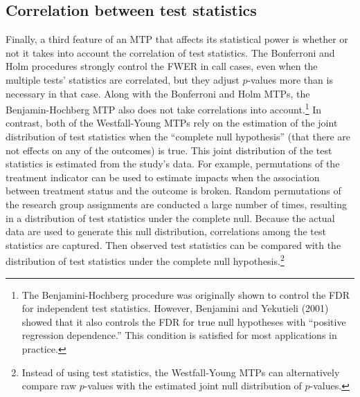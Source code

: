 \documentclass[
]{article}
\begin{document}
\subsection{Correlation between test statistics}
\label{sec:corr}

Finally, a third feature of an MTP that affects its statistical power is
whether or not it takes into account the correlation of test statistics.
The Bonferroni and Holm procedures strongly control the FWER in call
cases, even when the multiple tests' statistics are correlated, but they
adjust \(p\)-values more than is necessary in that case. Along with the
Bonferroni and Holm MTPs, the Benjamin-Hochberg MTP also does not take
correlations into
account.\footnote{The Benjamini-Hochberg procedure was originally shown to control the FDR for independent test statistics. However, Benjamini and Yekutieli (2001) showed that it also controls the FDR for true null hypotheses with “positive regression dependence.” This condition is satisfied
for most applications in practice.} In contrast, both of the
Westfall-Young MTPs rely on the estimation of the joint distribution of
test statistics when the ``complete null hypothesis'' (that there are
not effects on any of the outcomes) is true. This joint distribution of
the test statistics is estimated from the study's data. For example,
permutations of the treatment indicator can be used to estimate impacts
when the association between treatment status and the outcome is broken.
Random permutations of the research group assignments are conducted a
large number of times, resulting in a distribution of test statistics
under the complete null. Because the actual data are used to generate
this null distribution, correlations among the test statistics are
captured. Then observed test statistics can be compared with the
distribution of test statistics under the complete null
hypothesis.\footnote{Instead of using test statistics, the Westfall-Young MTPs can alternatively compare raw $p$-values with the estimated joint null distribution of $p$-values.}
\end{document}
